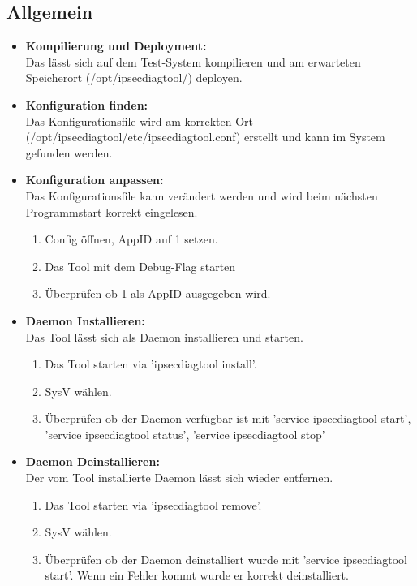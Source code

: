 \subsection{Allgemein}
\begin{itemize}
\item[\Square] \textbf{Kompilierung und Deployment:}\\
Das \tool lässt sich auf dem Test-System kompilieren und am erwarteten Speicherort (/opt/ipsecdiagtool/) deployen.
			   
\item[\Square] \textbf{Konfiguration finden:} \\
Das Konfigurationsfile wird am korrekten Ort (/opt/ipsecdiagtool/etc/ipsecdiagtool.conf) erstellt und kann im System gefunden werden. 
			   
\item[\Square] \textbf{Konfiguration anpassen:} \\
Das Konfigurationsfile kann verändert werden und wird beim nächsten Programmstart korrekt eingelesen.
\begin{enumerate} \itemsep1pt \parskip0pt 
  \item Config öffnen, AppID auf 1 setzen.
  \item Das Tool mit dem Debug-Flag starten
  \item Überprüfen ob 1 als AppID ausgegeben wird.
\end{enumerate}

\item[\Square] \textbf{Daemon Installieren:} \\
Das Tool lässt sich als Daemon installieren und starten.
\begin{enumerate} \itemsep1pt \parskip0pt 
  \item Das Tool starten via 'ipsecdiagtool install'.
  \item SysV wählen.
  \item Überprüfen ob der Daemon verfügbar ist mit 'service ipsecdiagtool start', 'service ipsecdiagtool status', 'service ipsecdiagtool stop'
\end{enumerate}

\item[\Square] \textbf{Daemon Deinstallieren:} \\
Der vom Tool installierte Daemon lässt sich wieder entfernen.
\begin{enumerate} \itemsep1pt \parskip0pt 
  \item Das Tool starten via 'ipsecdiagtool remove'.
  \item SysV wählen.
  \item Überprüfen ob der Daemon deinstalliert wurde mit 'service ipsecdiagtool start'. Wenn ein Fehler kommt wurde er korrekt deinstalliert.
\end{enumerate}
			   
\end{itemize}


